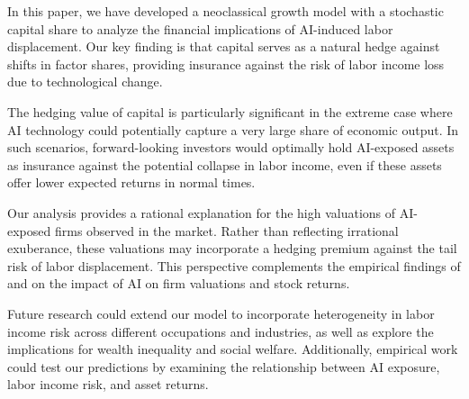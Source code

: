\documentclass{article}
\theoremstyle{plain}    %
\theoremstyle{definition}  %
\begin{document}
In this paper, we have developed a neoclassical growth model with a stochastic capital share to analyze the financial implications of AI-induced labor displacement. Our key finding is that capital serves as a natural hedge against shifts in factor shares, providing insurance against the risk of labor income loss due to technological change.

The hedging value of capital is particularly significant in the extreme case where AI technology could potentially capture a very large share of economic output. In such scenarios, forward-looking investors would optimally hold AI-exposed assets as insurance against the potential collapse in labor income, even if these assets offer lower expected returns in normal times.

Our analysis provides a rational explanation for the high valuations of AI-exposed firms observed in the market. Rather than reflecting irrational exuberance, these valuations may incorporate a hedging premium against the tail risk of labor displacement. This perspective complements the empirical findings of \citet{babina2024} and \citet{cao2024} on the impact of AI on firm valuations and stock returns.

Future research could extend our model to incorporate heterogeneity in labor income risk across different occupations and industries, as well as explore the implications for wealth inequality and social welfare. Additionally, empirical work could test our predictions by examining the relationship between AI exposure, labor income risk, and asset returns.

\printbibliography
\end{document}
